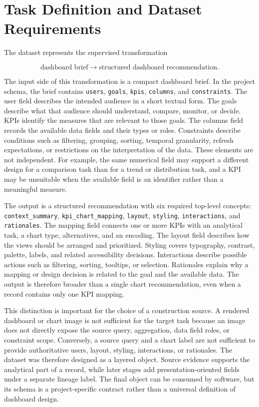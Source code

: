 \section{Task Definition and Dataset Requirements}

The dataset represents the supervised transformation

\[
\text{dashboard brief} \longrightarrow \text{structured dashboard recommendation}.
\]

The input side of this transformation is a compact dashboard brief. In the project schema, the brief contains \texttt{users}, \texttt{goals}, \texttt{kpis}, \texttt{columns}, and \texttt{constraints}. The user field describes the intended audience in a short textual form. The goals describe what that audience should understand, compare, monitor, or decide. KPIs identify the measures that are relevant to those goals. The columns field records the available data fields and their types or roles. Constraints describe conditions such as filtering, grouping, sorting, temporal granularity, refresh expectations, or restrictions on the interpretation of the data. These elements are not independent. For example, the same numerical field may support a different design for a comparison task than for a trend or distribution task, and a KPI may be unsuitable when the available field is an identifier rather than a meaningful measure.

The output is a structured recommendation with six required top-level concepts: \texttt{context\_summary}, \texttt{kpi\_chart\_mapping}, \texttt{layout}, \texttt{styling}, \texttt{interactions}, and \texttt{rationales}. The mapping field connects one or more KPIs with an analytical task, a chart type, alternatives, and an encoding. The layout field describes how the views should be arranged and prioritized. Styling covers typography, contrast, palette, labels, and related accessibility decisions. Interactions describe possible actions such as filtering, sorting, tooltips, or selection. Rationales explain why a mapping or design decision is related to the goal and the available data. The output is therefore broader than a single chart recommendation, even when a record contains only one KPI mapping.

This distinction is important for the choice of a construction source. A rendered dashboard or chart image is not sufficient for the target task because an image does not directly expose the source query, aggregation, data field roles, or constraint scope. Conversely, a source query and a chart label are not sufficient to provide authoritative users, layout, styling, interactions, or rationales. The dataset was therefore designed as a layered object. Source evidence supports the analytical part of a record, while later stages add presentation-oriented fields under a separate lineage label. The final object can be consumed by software, but its schema is a project-specific contract rather than a universal definition of dashboard design.

